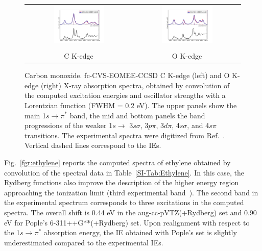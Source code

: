 \documentclass[journal=jctcce,manuscript=article]{achemso}
\begin{document}
\begin{figure}
\begin{tabular}{cc}
\hspace{-1cm}\includegraphics[width=0.50\textwidth]{Spectra/CO_C_2.pdf} &
\includegraphics[width=0.50\textwidth]{Spectra/CO_O_2_newshift.pdf}\\
%
\\C K-edge & O K-edge
\end{tabular}
\caption{Carbon monoxide. fc-CVS-EOMEE-CCSD
C K-edge (left) and O K-edge (right) X-ray absorption spectra, obtained by convolution of the computed excitation energies and oscillator strengths with a Lorentzian function (FWHM = 0.2 eV).
The upper panels show the main 1$s\to\pi^\ast$ band,
the mid and bottom panels the band progressions of the weaker 1$s\to$ 3$s\sigma$, 3$p\pi$, 3$d\pi$, 4$s\sigma$, and 4$s\pi$ transitions.
The experimental spectra were digitized from Ref.~.
Vertical dashed lines correspond to the IEs.
\label{fgr:co_both}
}
\end{figure}

\clearpage
Fig.~\ref{fgr:ethylene} reports the computed spectra of ethylene
obtained by convolution of the spectral data in Table~\ref{SI-Tab:Ethylene}. In this case, the Rydberg functions also improve the description of the higher energy region approaching the ionization limit (third experimental band~\cite{NEXAFS_C2H4_CH2CHF_Exp}). 
The second band in the experimental spectrum corresponds to three excitations in the computed spectra.
The overall shift is 0.44 eV in the aug-cc-pVTZ(+Rydberg) set and 0.90 eV for Pople's 6-311++G**(+Rydberg) set. Upon realignment
with respect to the 1$s\to \pi^\ast$ absorption energy, the IE obtained with Pople's set is slightly underestimated compared to the experimental IEs.
\end{document}
